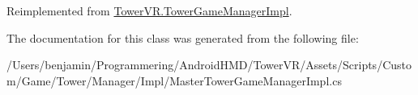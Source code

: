 Reimplemented from \hyperlink{class_tower_v_r_1_1_tower_game_manager_impl_a04ad123026136abf9c009ff4c03937dc}{Tower\+V\+R.\+Tower\+Game\+Manager\+Impl}.



The documentation for this class was generated from the following file\+:\begin{DoxyCompactItemize}
\item 
/\+Users/benjamin/\+Programmering/\+Android\+H\+M\+D/\+Tower\+V\+R/\+Assets/\+Scripts/\+Custom/\+Game/\+Tower/\+Manager/\+Impl/Master\+Tower\+Game\+Manager\+Impl.\+cs\end{DoxyCompactItemize}

